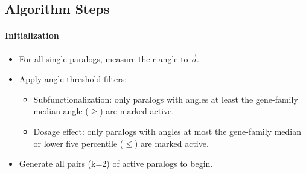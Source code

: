     \subsection{Algorithm Steps}

        \paragraph{Initialization}
        \begin{itemize}
            \item For all single paralogs, measure their angle to $\vec{o}$.
            \item Apply angle threshold filters:
            \begin{itemize}
                \item Subfunctionalization: only paralogs with angles at least the gene-family median angle ($\geq$) are marked active.
                \item Dosage effect: only paralogs with angles at most the gene-family median or lower five percentile ($\leq$) are marked active.
            \end{itemize}
            \item Generate all pairs (k=2) of active paralogs to begin.
        \end{itemize}

